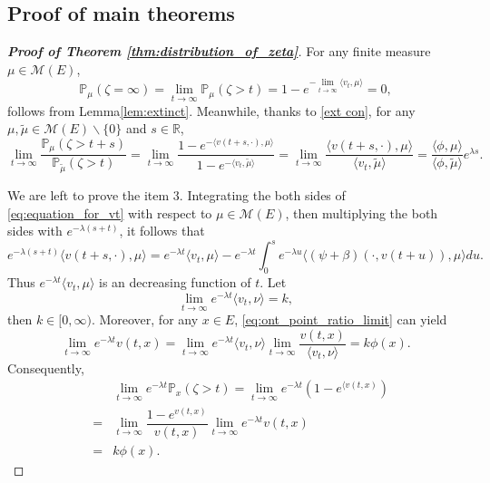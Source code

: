 \documentclass[12pt,a4paper]{amsart}
\numberwithin{equation}{section}
\theoremstyle{plain}
\theoremstyle{definition}
\begin{document}
\subsection{Proof of main theorems}
\begin{proof}[{\bf Proof of Theorem \ref{thm:distribution_of_zeta}}]
	For any finite measure $\mu\in \mathcal M(E)$,
  \[
    \mathbb P_\mu(\zeta=\infty)=\lim_{t\rightarrow\infty}\mathbb P_\mu(\zeta>t)=1-e^{-\lim_{t\rightarrow\infty}\langle v_t,\mu\rangle }=0,
  \]
	follows from Lemma\ref{lem:extinct}.
	Meanwhile, thanks to \eqref{ext con}, for any $\mu,\widetilde\mu\in \mathcal M(E)\backslash\{0\}$ and $s\in\mathbb R$,
  \[
    \lim_{t\rightarrow\infty}\frac{\mathbb P_{\mu}(\zeta>t+s)}{\mathbb P_{\widetilde\mu}(\zeta>t)}=\lim_{t\rightarrow\infty}\frac{1-e^{-\langle v(t+s,\cdot),\mu\rangle }}{1-e^{-\langle v_t,\widetilde\mu\rangle }}
    =\lim_{t\rightarrow\infty}\frac{\langle v(t+s,\cdot),\mu\rangle }{\langle v_t,\widetilde\mu\rangle }=\frac{\langle \phi,\mu\rangle }{\langle \phi,\widetilde\mu\rangle }e^{\lambda s}.
  \]

	We are left to prove the item $3$.  Integrating the both sides of \eqref{eq:equation_for_vt} with respect to $\mu\in\mathcal M(E)$, then multiplying the both sides with  $e^{-\lambda(s+t)}$, it follows that
  \begin{equation}\label{eq:ext_equ_int}
    e^{-\lambda(s+t)}\langle v(t+s,\cdot), \mu\rangle =e^{-\lambda t}\langle v_t,\mu\rangle -e^{-\lambda t}\int_0^s e^{-\lambda u}\langle (\psi+\beta)(\cdot, v(t+u)),\mu\rangle du.
  \end{equation}
	Thus $e^{-\lambda t}\langle v_t, \mu\rangle$ is an decreasing function of $t$. Let
  \begin{equation}\label{eq:def_of_k}
    \lim_{t\to\infty}e^{-\lambda t}\langle v_t, \nu\rangle=k,
  \end{equation}
 	then $k\in[0,\infty)$. Moreover, for any $x\in E$, \eqref{eq:ont_point_ratio_limit} can yield
  \[
    \lim_{t\rightarrow\infty}e^{-\lambda t}v(t,x)=\lim_{t\to\infty}e^{-\lambda t}\langle v_t,\nu\rangle \lim_{t\to\infty}\dfrac{v(t,x)}{\langle v_t,\nu\rangle }=k\phi(x).
  \]
	Consequently,
  \begin{eqnarray*}
    &&\lim_{t\rightarrow\infty}e^{-\lambda t}\mathbb P_{x}(\zeta>t)=\lim_{t\rightarrow\infty}e^{-\lambda t}\left(1-e^{\langle v(t,x)}\right)\\	
    &=&\lim_{t\rightarrow\infty}\dfrac{1-e^{ v(t,x)}}{v(t,x)}\lim_{t\to\infty}e^{-\lambda t}v(t,x)\\
    &=& k\phi(x).
  \end{eqnarray*}


\end{proof}
\end{document}
